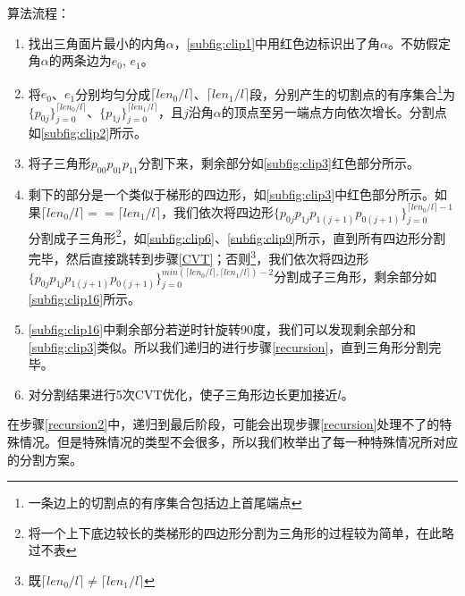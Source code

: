 算法流程：
\begin{enumerate}
    \item 找出三角面片最小的内角$\alpha$，\autoref{subfig:clip1}中用红色边标识出了角$\alpha$。不妨假定角$\alpha$的两条边为$e_0$, $e_1$。

    \item 将$e_0$、$e_1$分别均匀分成$\lceil len_0/l \rceil$、$\lceil len_1/l \rceil$段，分别产生的切割点的有序集合\footnote{一条边上的切割点的有序集合包括边上首尾端点}为$\{p_{0j}\}^{\lceil len_0/l \rceil}_{j=0}$、$\{p_{1j}\}^{\lceil len_1/l \rceil}_{j=0}$，且$j$沿角$\alpha$的顶点至另一端点方向依次增长。分割点如\autoref{subfig:clip2}所示。

    \item 将子三角形$p_{00}p_{01}p_{11}$分割下来，剩余部分如\autoref{subfig:clip3}红色部分所示。

    \item 剩下的部分是一个类似于梯形的四边形，如\autoref{subfig:clip3}中红色部分所示。如果$\lceil len_0/l \rceil == \lceil len_1/l \rceil$，我们依次将四边形$\{p_{0j}p_{1j}p_{1(j+1)}p_{0(j+1)}\}^{\lceil len_0/l \rceil - 1}_{j=0}$分割成子三角形\footnote{将一个上下底边较长的类梯形的四边形分割为三角形的过程较为简单，在此略过不表}，如\autoref{subfig:clip6}、\autoref{subfig:clip9}所示，直到所有四边形分割完毕，然后直接跳转到步骤\ref{CVT}；否则\footnote{既$\lceil len_0/l \rceil \ne \lceil len_1/l \rceil$}，我们依次将四边形$\{p_{0j}p_{1j}p_{1(j+1)}p_{0(j+1)}\}^{min(\lceil len_0/l \rceil, \lceil len_1/l \rceil) - 2}_{j=0}$分割成子三角形，剩余部分如\autoref{subfig:clip16}所示。\label{recursion}

    \item \autoref{subfig:clip16}中剩余部分若逆时针旋转90度，我们可以发现剩余部分和\autoref{subfig:clip3}类似。所以我们递归的进行步骤\ref{recursion}，直到三角形分割完毕。\label{recursion2}

    \item 对分割结果进行5次CVT\cite{du1999}优化，使子三角形边长更加接近$l$。\label{CVT}
\end{enumerate}

在步骤\ref{recursion2}中，递归到最后阶段，可能会出现步骤\ref{recursion}处理不了的特殊情况。但是特殊情况的类型不会很多，所以我们枚举出了每一种特殊情况所对应的分割方案。

